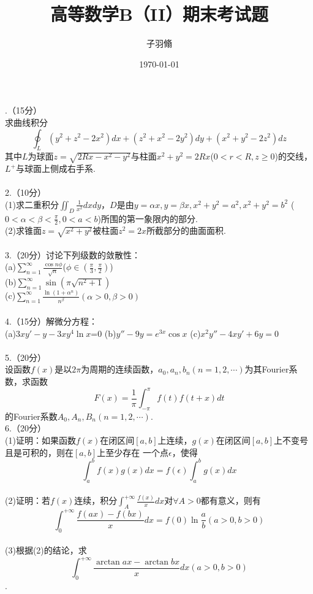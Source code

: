 \documentclass[UTF8]{ctexart}
\begin{document}
	\title{\textbf{高等数学B（II）期末考试题}}
	\author{子羽翛}
	\date{\today}
	.（15分）\\
	求曲线积分\[\oint_{L}(y^2+z^2-2x^2)dx+(z^2+x^2-2y^2)dy+(x^2+y^2-2z^2)dz\]
	其中$L$为球面$z=\sqrt{2Rx-x^2-y^2}$与柱面$x^2+y^2=2Rx$($0<r<R,z\geq0$)的交线，$L^{+}$与球面上侧成右手系.\\
	\\2.（10分）\\
	(1)求二重积分$\iint_{D}\frac{1}{x^2}dxdy$，$D$是由$y=\alpha x,y=\beta x,x^2+y^2=a^2,x^2+y^2=b^2$
	($0<\alpha<\beta<\frac{\pi}{2},0<a<b$)所围的第一象限内的部分.\\
	(2)求锥面$z=\sqrt{x^2+y^2}$被柱面$z^2=2x$所截部分的曲面面积.\\
	\\3.（20分）讨论下列级数的敛散性：\\
	(a)$\sum_{n=1}^{\infty}\frac{\cos{n\phi}}{\sqrt{n}}$($\phi\in(\frac{\pi}{3},\frac{\pi}{2})$)\\
	(b)$\sum_{n=1}^{\infty}\sin{(\pi\sqrt{n^2+1})}$\\
	(c)$\sum_{n=1}^{\infty}\frac{\ln{(1+\alpha^n)}}{n^\beta}(\alpha>0,\beta>0)$\qquad\\
	\\4.（15分）解微分方程：\\
	(a)$3xy'-y-3xy^4$$\ln{x}$=0\qquad
	(b)$y''-9y=e^{3x}\cos{x}$\qquad
	(c)$x^2y''-4xy'+6y=0$\\
	\\5.（20分）\\
	设函数$f(x)$是以$2\pi$为周期的连续函数，$a_{0},a_{n},b_{n}(n=1,2,\cdots)$为其Fourier系数，求函数
	\[F(x)=\frac{1}{\pi}\int_{-\pi}^{\pi}f(t)f(t+x)dt\]的Fourier系数$A_{0},A_{n},B_{n}(n=1,2,\cdots)$.
	\\6.（20分）\\
	(1)证明：如果函数$f(x)$在闭区间$[a,b]$上连续，$g(x)$在闭区间$[a,b]$上不变号且是可积的，则在$[a,b]$上至少存在
	一个点$\epsilon$，使得\[\int_{a}^{b}f(x)g(x)dx=f(\epsilon)\int_{a}^{b}g(x)dx\]\\
	(2)证明：若$f(x)$连续，积分$\int_{A}^{+\infty}\frac{f(x)}{x}dx$对$\forall A>0$都有意义，则有
	\[\int_{0}^{+\infty}\frac{f(ax)-f(bx)}{x}dx=f(0)\ln{\frac{a}{b}}(a>0,b>0)\]\\
	(3)根据(2)的结论，求\[\int_{0}^{+\infty}\frac{\arctan{ax}-\arctan{bx}}{x}dx(a>0,b>0)\].
\end{document}
